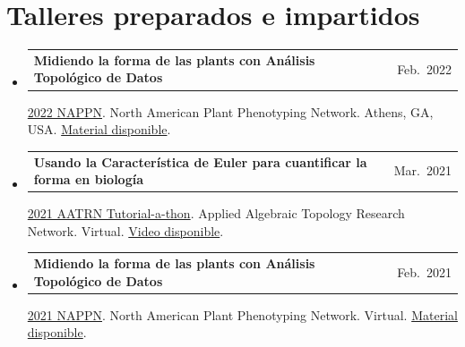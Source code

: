 \documentclass[A4,11pt]{article}
\makeatletter
\newcommand{\CVQubheading}[3]{
	\vspace{-0.5ex}\item
	\begin{tabular*}{0.97\textwidth}[t]{l@{\extracolsep{\fill}}r}
		\textbf{#1} & #2 \\
	\end{tabular*}
   {\small #3}\vspace{-0.5ex}
}
\newcommand{\CVSubHeadingListStart}{\begin{itemize}[leftmargin=0.5cm, label={}]}
\newcommand{\CVSubHeadingListEnd}{\end{itemize}}
\makeatother
\begin{document}
		\section{Talleres preparados e impartidos}
		\CVSubHeadingListStart
		\CVQubheading
		{Midiendo la forma de las plants con An\'alisis Topol\'ogico de Datos}{Feb.~2022}
		{\hyperref{https://www.plantphenotyping.org/conference-home}{}{}{2022 NAPPN}. North American Plant Phenotyping Network. Athens, GA, USA. \hyperref{https://colab.research.google.com/github/amezqui3/demeter/blob/main/tutorial/nappn2022_shape_of_things_to_come.ipynb}{}{}{Material disponible}.}
		\CVQubheading
		{Usando la Caracter\'istica de Euler para cuantificar la forma en biolog\'ia}{Mar.~2021}
		{\hyperref{https://sites.google.com/view/aatrn-tutorial-a-thon}{}{}{2021 AATRN Tutorial-a-thon}. Applied Algebraic Topology Research Network. Virtual.  \hyperref{https://www.youtube.com/watch?v=LtI6Y9ct1hc}{}{}{Video disponible}.}
		\CVQubheading
		{Midiendo la forma de las plants con An\'alisis Topol\'ogico de Datos}{Feb.~2021}
		{\hyperref{https://www.plantphenotyping.org/conference-home}{}{}{2021 NAPPN}. North American Plant Phenotyping Network. Virtual. \hyperref{https://github.com/amezqui3/ect_and_barley}{}{}{Material disponible}.}
		\CVSubHeadingListEnd
		
\end{document}
